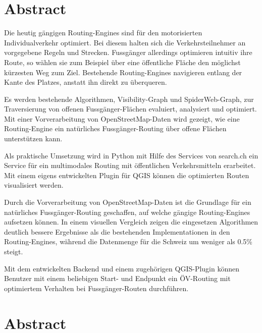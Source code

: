 
\chapter*{Abstract}

Die heutig gängigen Routing-Engines sind für den motorisierten Individualverkehr optimiert. Bei diesem halten sich die Verkehrsteilnehmer an vorgegebene Regeln und Strecken. Fussgänger allerdings optimieren intuitiv ihre Route, so wählen sie zum Beispiel über eine öffentliche Fläche den möglichst kürzesten Weg zum Ziel. Bestehende Routing-Engines navigieren entlang der Kante des Platzes, anstatt ihn direkt zu überqueren.

Es werden bestehende Algorithmen, Visibility-Graph und SpiderWeb-Graph, zur Traversierung von offenen Fussgänger-Flächen evaluiert, analysiert und optimiert. Mit einer Vorverarbeitung von OpenStreetMap-Daten wird gezeigt, wie eine Routing-Engine ein natürliches Fussgänger-Routing über offene Flächen unterstützen kann.

Als praktische Umsetzung wird in Python mit Hilfe des Services von search.ch ein Service für ein multimodales Routing mit öffentlichen Verkehrsmitteln erarbeitet. Mit einem eigens entwickelten Plugin für QGIS können die optimierten Routen visualisiert werden.

Durch die Vorverarbeitung von OpenStreetMap-Daten ist die Grundlage für ein natürliches Fussgänger-Routing geschaffen, auf welche gängige Routing-Engines aufsetzen können. In einem visuellen Vergleich zeigen die eingesetzen Algorithmen  deutlich bessere Ergebnisse als die bestehenden Implementationen in den Routing-Engines, während die Datenmenge für die Schweiz um weniger als 0.5\% steigt.

Mit dem entwickelten Backend und einem zugehörigen QGIS-Plugin können Benutzer mit einem beliebigen Start- und Endpunkt ein ÖV-Routing mit optimiertem Verhalten bei Fussgänger-Routen durchführen.

\cleardoublepage

\chapter*{Abstract}

